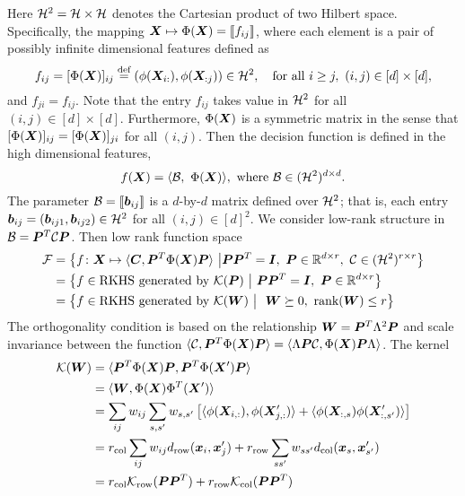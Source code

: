 \documentclass[12pt]{article}
\begin{document}
Here $\mathcal{H}^2=\mathcal{H}\times \mathcal{H}$ denotes the Cartesian product of two Hilbert space. Specifically, the mapping $\bm X\mapsto\Phi(\bm X)=\llbracket f_{ij} \rrbracket$, where each element is a pair of possibly infinite dimensional features defined as
\[
f_{ij}=[\Phi(\mX)]_{ij}\stackrel{\text{def}}{=}(\phi(\mX_{i:}), \phi(\mX_{:j})) \in \tH^2,\quad \text{for all }i\geq j,\ (i,j)\in[d]\times [d],
\]
and $f_{ji}=f_{ij}$. Note that the entry $f_{ij}$ takes value in $\mathcal{H}^2$ for all $(i,j)\in[d]\times [d]$. Furthermore, $\Phi(\bm X)$ is a symmetric matrix in the sense that $[\Phi(\bm X)]_{ij}=[\Phi(\bm X)]_{ji}$ for all $(i,j)$. 
Then the decision function is defined in the high dimensional features,
\[
f(\mX)=\langle \tB,\ \Phi(\mX)\rangle, \ \text{where } \tB \in (\tH^2)^{d\times d}.
\]
The parameter $\mathcal{B}=\llbracket \bm{b}_{ij} \rrbracket$ is a $d$-by-$d$ matrix defined over $\mathcal{H}^2$; that is, each entry $\bm{b}_{ij}=(\bm{b}_{ij1},\bm{b}_{ij2})\in \mathcal{H}^2$ for all $(i,j)\in[d]^2$. We consider low-rank structure in $\mathcal{B}=\bm{P}^T\mathcal{C}\bm{P}$. Then low rank function space
\begin{align}
\tF&=\left\{f\colon \mX\mapsto \langle \mC, \mP^T\Phi(\mX)\mP \rangle\ \big| \mP\mP^T=\mI,\ \mP\in\mathbb{R}^{d\times r},\ \tC\in (\tH^2)^{r\times r}  \right\}\\
&=\left\{ f\in\text{RKHS generated by $\tK(\mP)$}\ \big|\ \mP\mP^T=\mI,\ \mP\in\mathbb{R}^{d\times r} \right\}\\
&=\left\{ f\in\text{RKHS generated by $\tK(\mW)$}\ \big|\ \ \mW \succeq 0,\ \text{rank}(\mW)\leq r\right\}
\end{align}
The orthogonality condition is based on the relationship $\bm{W}=\bm{P}^T\Lambda^2\bm{P}$ and scale invariance between the function $\langle \mathcal{C}, \bm{P}^T\Phi(\bm X)\bm{P}\rangle = \langle \Lambda\bm{P}\mathcal{C},\Phi(\bm X)\bm{P} \Lambda\rangle$.
The kernel 
\begin{align}
\mathcal{K}(\bm{W})&=\langle \bm{P}^T\Phi(\bm X)\bm{P},\bm{P}^T\Phi(\bm X')\bm{P}\rangle \\
&= \langle \bm{W}, \Phi(\bm X)\Phi^T(\bm X')\rangle\\
&=\sum_{ij}w_{ij}   \sum_{s,s'}w_{s,s'}\left[ \langle \phi(\bm X_{i,:}),  \phi(\bm X'_{j,:})  \rangle + \langle \phi(\bm X_{:,s}) \phi(\bm X'_{:,s'})  \rangle\right]\\
&= r_{\text{col}}\sum_{ij}w_{ij}d_{\text{row}}(\bm x_i,\bm x'_j) + r_{\text{row}}\sum_{ss'}w_{ss'}d_{\text{col}}(\bm x_s,\bm x'_{s'})\\
&=r_{\text{col}}\mathcal{K}_{\text{row}}(\bm{P}\bm{P}^T)+r_{\text{row}}\mathcal{K}_{\text{col}}(\bm{P}\bm{P}^T)
\end{align} 
\end{document}
